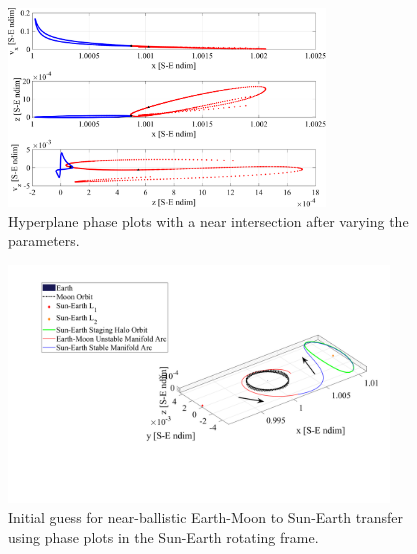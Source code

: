 \begin{figure}[ht]
    \centering
    \includegraphics[width=0.75\textwidth]{figures/PhasePlotsIntersect.pdf}
    \caption{Hyperplane phase plots with a near intersection after varying the parameters.}
    \label{fig:phasePlotsIntersect}
\end{figure}

\begin{figure}[ht]
    \centering
    \includegraphics[width=0.9\textwidth]{figures/InitialGuess.pdf}
    \caption{Initial guess for near-ballistic Earth-Moon to Sun-Earth transfer using phase plots in the Sun-Earth rotating frame.}
    \label{fig:initialGuess}
\end{figure}


